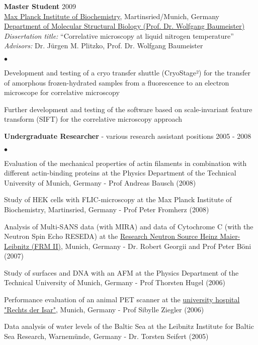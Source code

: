 \documentclass[margin,line]{res}
\newenvironment{list2}{
  \begin{list}{$\bullet$}{%
      \setlength{\itemsep}{0in}
      \setlength{\parsep}{0in} \setlength{\parskip}{0in}
      \setlength{\topsep}{0in} \setlength{\partopsep}{0in} 
      \setlength{\leftmargin}{0.2in}}}{\end{list}}
\begin{document}
\begin{resume}
{\bf Master Student} \hfill {2009}\\
\href{https://www.biochem.mpg.de/en}{Max Planck Institute of Biochemistry}, Martinsried/Munich, Germany\\
\href{https://www.biochem.mpg.de/baumeister}{Department of Molecular Structural Biology (Prof. Dr. Wolfgang Baumeister)}\\
{\it Dissertation title:} “Correlative microscopy at liquid nitrogen temperature”\\
{\it Advisors:} Dr. Jürgen M. Plitzko, Prof. Dr. Wolfgang Baumeister\\
\vspace*{-2mm}
\begin{list2}
\vspace*{-1mm}
\item Development and testing of a cryo transfer shuttle (CryoStage²) for the transfer of amorphous frozen-hydrated samples from a fluorescence to an electron microscope for correlative microscopy
\item Further development and testing of the software based on scale-invariant feature transform (SIFT) for the correlative microscopy approach
\end{list2}
{\bf Undergraduate Researcher} - various research assistant positions \hfill {2005 - 2008}\\
\vspace*{-2mm}
\begin{list2}
\vspace*{-1mm}
\item Evaluation of the mechanical properties of actin filaments in combination with different actin-binding proteins at the Physics Department of the Technical University of Munich, Germany - Prof Andreas Bausch (2008)
\item Study of HEK cells with FLIC-microscopy at the Max Planck Institute of Biochemistry, Martinsried, Germany - Prof Peter Fromherz (2008)
\item Analysis of Multi-SANS data (with MIRA) and data of Cytochrome C (with the Neutron Spin Echo RESEDA) at the  \href{https://www.frm2.tum.de/en/home/}{Research Neutron Source Heinz Maier-Leibnitz (FRM II)}, Munich, Germany - Dr. Robert Georgii and Prof Peter Böni (2007)
\item Study of surfaces and DNA with an AFM at the Physics Department of the Technical University of Munich, Germany - Prof Thorsten Hugel (2006)
\item Performance evaluation of an animal PET scanner at the  \href{https://www.mri.tum.de/}{university hospital "Rechts der Isar"}, Munich, Germany - Prof Sibylle Ziegler (2006)
\item Data analysis of water levels of the Baltic Sea at the Leibnitz Institute for Baltic Sea Research, Warnemünde, Germany - Dr. Torsten Seifert (2005)
\end{list2}


\end{resume}
\end{document}
